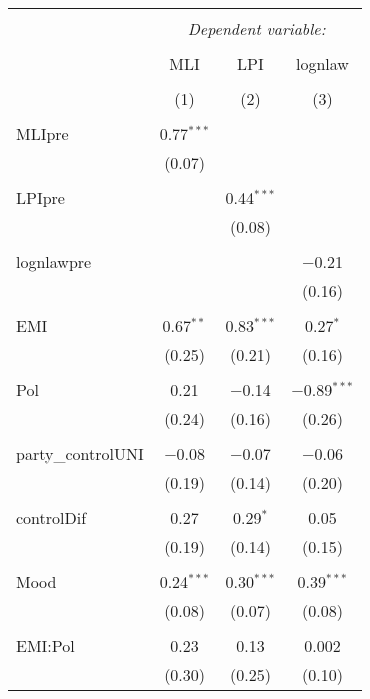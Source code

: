 
\begin{table}[!htbp] \centering 
  \caption{} 
  \label{} 
\begin{tabular}{@{\extracolsep{5pt}}lccc} 
\\[-1.8ex]\hline 
\hline \\[-1.8ex] 
 & \multicolumn{3}{c}{\textit{Dependent variable:}} \\ 
\cline{2-4} 
\\[-1.8ex] & MLI & LPI & lognlaw \\ 
\\[-1.8ex] & (1) & (2) & (3)\\ 
\hline \\[-1.8ex] 
 MLIpre & 0.77$^{***}$ &  &  \\ 
  & (0.07) &  &  \\ 
  & & & \\ 
 LPIpre &  & 0.44$^{***}$ &  \\ 
  &  & (0.08) &  \\ 
  & & & \\ 
 lognlawpre &  &  & $-$0.21 \\ 
  &  &  & (0.16) \\ 
  & & & \\ 
 EMI & 0.67$^{**}$ & 0.83$^{***}$ & 0.27$^{*}$ \\ 
  & (0.25) & (0.21) & (0.16) \\ 
  & & & \\ 
 Pol & 0.21 & $-$0.14 & $-$0.89$^{***}$ \\ 
  & (0.24) & (0.16) & (0.26) \\ 
  & & & \\ 
 party\_controlUNI & $-$0.08 & $-$0.07 & $-$0.06 \\ 
  & (0.19) & (0.14) & (0.20) \\ 
  & & & \\ 
 controlDif & 0.27 & 0.29$^{*}$ & 0.05 \\ 
  & (0.19) & (0.14) & (0.15) \\ 
  & & & \\ 
 Mood & 0.24$^{***}$ & 0.30$^{***}$ & 0.39$^{***}$ \\ 
  & (0.08) & (0.07) & (0.08) \\ 
  & & & \\ 
 EMI:Pol & 0.23 & 0.13 & 0.002 \\ 
  & (0.30) & (0.25) & (0.10) \\ 

\end{tabular}
\end{table}
